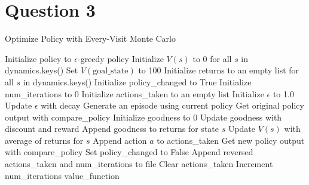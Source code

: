 \documentclass[letterpaper]{article} %
\begin{document}
\section{Question 3}
    \begin{algorithm}
    \caption{Optimize Policy with Every-Visit Monte Carlo}
    \begin{algorithmic}[1]
    \State Initialize policy to $\epsilon$-greedy policy \label{alg:greedy_policy}
    \State Initialize $V(s)$ to 0 for all $s$ in dynamics.keys()
	\State Set $V(\text{goal\_state})$ to 100 \label{alg:high_value_goal}
    \State Initialize returns to an empty list for all $s$ in dynamics.keys()
    \State Initialize policy\_changed to True
    \State Initialize num\_iterations to 0
    \State Initialize actions\_taken to an empty list
    \State Initialize $\epsilon$ to 1.0
	\State Update $\epsilon$ with decay
	\State Generate an episode using current policy
	\State Get original policy output with compare\_policy
	\State Initialize goodness to 0
	\label{alg:reversed_episode}
	    \State Update goodness with discount and reward
	    \State Append goodness to returns for state $s$
	    \State Update $V(s)$ with average of returns for $s$
	    \State Append action $a$ to actions\_taken
	\EndFor
	\State Get new policy output with compare\_policy \label{alg:action_compare}
	    \State Set policy\_changed to False
	    \State Append reversed actions\_taken and num\_iterations to file
	\EndIf
	\State Clear actions\_taken
	\State Increment num\_iterations
    \EndWhile
    \State \Return value\_function
    \end{algorithmic}
      \label{alg:every_visit_mc}
    \end{algorithm}
\end{document}
